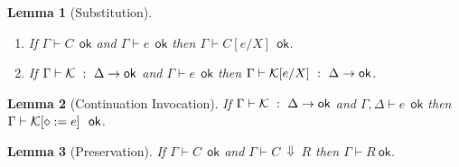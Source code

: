 \documentclass{article}
\newtheorem{lemma}{Lemma}
\newcommand{\G}{\Gamma}
\newcommand{\D}{\Delta}
\newcommand{\C}{C}     %
\newcommand{\X}{X}     %
\newcommand{\e}{e}     %
\newcommand{\R}{R}     %
\newcommand{\KK}{{\cal K}} %
\newcommand{\subst}[3]{#1[#3/#2]} %
\newcommand{\hole}{\diamond}
\newcommand{\evalto}[3][\G]{#1 \vdash #2 \ \Downarrow\  #3}
\newcommand{\resultok}[2][\G]{#1 \vdash #2 \ \mathsf{ok}}
\newcommand{\eok}[2][\G]{#1 \vdash #2 \ \ \mathsf{ok}}
\newcommand{\cok}[2][\G]{#1 \vdash #2 \ \ \mathsf{ok}}
\newcommand{\kok}[3][\G]{#1 \vdash #3 \ : \ #2\to\mathsf{ok}}
\begin{document}
\begin{lemma}[Substitution]
  \mbox{}
  \begin{enumerate}
    \item If $\cok{\C}$ and $\eok{\e}$ then $\cok{\subst{\C}{\X}{\e}}$.
    \item If $\kok{\D}{\KK}$ and $\eok{\e}$ then $\kok{\D}{\subst{\KK}{\X}{\e}}$.
  \end{enumerate}
\end{lemma}

\begin{lemma}[Continuation Invocation]
  If $\kok{\D}{\KK}$ and $\eok[\G,\D]{\e}$ then $\cok{\KK[\hole:=\e]}$.
\end{lemma}

\begin{lemma}[Preservation]
   If $\cok{\C}$ and $\evalto{\C}{\R}$ then $\resultok{\R}$.
\end{lemma}
\end{document}
